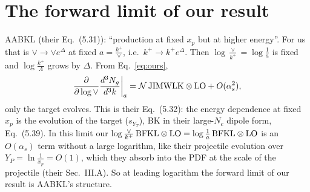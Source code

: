 \documentclass[10pt]{article}
\numberwithin{equation}{section}
\newcommand{\JJ}{{\rm JIMWLK}\otimes{\rm LO}}
\newcommand{\BB}{{\rm BFKL}\otimes{\rm LO}}
\begin{document}
\section{The forward limit of our result}\label{sec:forward}
AABKL (their Eq.~(5.31)): ``production at fixed $x_p$ but at higher energy''. For us that is $\vee\to\vee e^\Delta$ at fixed $a=\frac{k^+}{\vee}$, i.e.\ $k^+\to k^+e^\Delta$. Then $\log\frac{\vee}{k^+}=\log\frac1a$ is fixed and $\log\frac{k^+}{\Lambda}$ grows by $\Delta$. From Eq.~\eqref{eq:ours},
\begin{equation}
\frac{\partial}{\partial\log\vee}\frac{d^3N_g}{d^3k}\bigg|_{a}=\mathcal N\,\JJ+O(\alpha_s^2),
\end{equation}
only the target evolves. This is their Eq.~(5.32): the energy dependence at fixed $x_p$ is the evolution of the target ($s_{Y_T}$), BK in their large-$N_c$ dipole form, Eq.~(5.39). In this limit our $\log\frac{\vee}{k^+}\,\BB=\log\frac1a\,\BB$ is an $O(\alpha_s)$ term without a large logarithm, like their projectile evolution over $Y_P=\ln\frac1{x_p}=O(1)$, which they absorb into the PDF at the scale of the projectile (their Sec.~III.A). So at leading logarithm the forward limit of our result is AABKL's structure.
\end{document}
